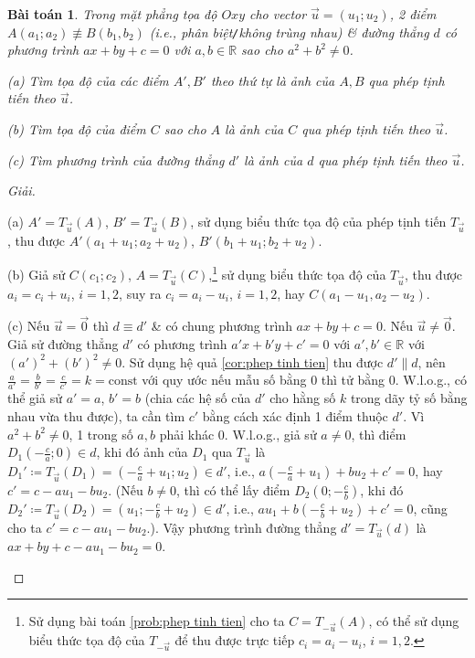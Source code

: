 \documentclass[oneside]{book}
\numberwithin{equation}{section}
\newtheorem{baitoan}{Bài toán}[section]
\begin{document}
\begin{baitoan}
	Trong mặt phẳng tọa độ $Oxy$ cho vector $\vec{u} = (u_1;u_2)$, 2 điểm $A(a_1;a_2)\not\equiv B(b_1,b_2)$ (i.e., phân biệt\emph{\texttt{/}}không trùng nhau) \& đường thẳng $d$ có phương trình $ax + by + c = 0$ với $a,b\in\mathbb{R}$ sao cho $a^2 + b^2\ne 0$.
	\begin{enumerate*}
		\item[(a)] Tìm tọa độ của các điểm $A',B'$ theo thứ tự là ảnh của $A,B$ qua phép tịnh tiến theo $\vec{u}$.
		\item[(b)] Tìm tọa độ của điểm $C$ sao cho $A$ là ảnh của $C$ qua phép tịnh tiến theo $\vec{u}$.
		\item[(c)] Tìm phương trình của đường thẳng $d'$  là ảnh của $d$ qua phép tịnh tiến theo $\vec{u}$.
	\end{enumerate*}
\end{baitoan}

\begin{proof}[Giải]
	\begin{enumerate*}
		\item[(a)] $A' = T_{\vec{u}}(A)$, $B' = T_{\vec{u}}(B)$, sử dụng biểu thức tọa độ của phép tịnh tiến $T_{\vec{u}}$, thu được $A'(a_1 + u_1;a_2 + u_2)$, $B'(b_1 + u_1;b_2 + u_2)$.
		\item[(b)] Giả sử $C(c_1;c_2)$, $A = T_{\vec{u}}(C)$,\footnote{Sử dụng bài toán \ref{prob:phep tinh tien} cho ta $C = T_{-\vec{u}}(A)$, có thể sử dụng biểu thức tọa độ của $T_{-\vec{u}}$ để thu được trực tiếp $c_i = a_i - u_i$, $i = 1,2$.} sử dụng biểu thức tọa độ của $T_{\vec{u}}$, thu được $a_i = c_i + u_i$, $i = 1,2$, suy ra $c_i = a_i - u_i$, $i = 1,2$, hay $C(a_1 - u_1,a_2 - u_2)$.
		\item[(c)] Nếu $\vec{u} = \vec{0}$ thì $d\equiv d'$ \& có chung phương trình $ax + by + c = 0$. Nếu $\vec{u}\ne\vec{0}$. Giả sử đường thẳng $d'$ có phương trình $a'x + b'y + c' = 0$ với $a',b'\in\mathbb{R}$ với $(a')^2 + (b')^2\ne 0$. Sử dụng hệ quả \ref{cor:phep tinh tien} thu được $d'\parallel d$, nên $\frac{a}{a'} = \frac{b}{b'} = \frac{c}{c'} = k = \mbox{const}$ với quy ước nếu mẫu số bằng $0$ thì tử bằng $0$. W.l.o.g., có thể giả sử $a' = a$, $b' = b$ (chia các hệ số của $d'$ cho hằng số $k$ trong dãy tỷ số bằng nhau vừa thu được), ta cần tìm $c'$ bằng cách xác định 1 điểm thuộc $d'$. Vì $a^2 + b^2\ne 0$, 1 trong số $a,b$ phải khác $0$. W.l.o.g., giả sử $a\ne 0$, thì điểm $D_1\left(-\frac{c}{a};0\right)\in d$, khi đó ảnh của $D_1$ qua $T_{\vec{u}}$ là $D_1'\coloneqq T_{\vec{u}}(D_1) = \left(-\frac{c}{a} + u_1;u_2\right)\in d'$, i.e., $a\left(-\frac{c}{a} + u_1\right) + bu_2 + c' = 0$, hay $c' = c - au_1 - bu_2$. (Nếu $b\ne 0$, thì có thể lấy điểm $D_2\left(0;-\frac{c}{b}\right)$, khi đó $D_2'\coloneqq T_{\vec{u}}(D_2) = \left(u_1;-\frac{c}{b} + u_2\right)\in d'$, i.e., $au_1 + b\left(-\frac{c}{b} + u_2\right) + c' = 0$, cũng cho ta $c' = c - au_1 - bu_2$.). Vậy phương trình đường thẳng $d' = T_{\vec{u}}(d)$ là $ax + by + c - au_1 - bu_2 = 0$.
	\end{enumerate*}
\end{proof}
\end{document}
